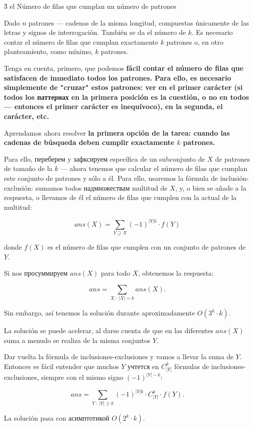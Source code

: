 \h3{ el Número de filas que cumplan un número de patrones }

Dado $n$ patrones --- cadenas de la misma longitud, compuestas únicamente de las letras y signos de interrogación. También se da el número de $k$. Es necesario contar el número de filas que cumplan exactamente $k$ patrones o, en otro planteamiento, como mínimo, $k$ patrones.

Tenga en cuenta, primero, que podemos \bf{fácil contar el número de filas} que satisfacen de inmediato todos los patrones. Para ello, es necesario simplemente de "cruzar" estos patrones: ver en el primer carácter (si todos los паттернах en la primera posición es la cuestión, o no en todos --- entonces el primer carácter es inequívoco), en la segunda, el carácter, etc.

Aprendamos ahora resolver \bf{la primera opción de la tarea}: cuando las cadenas de búsqueda deben cumplir exactamente $k$ patrones.

Para ello, переберем y зафксируем específica de un subconjunto de $X$ de patrones de tamaño de la $k$ --- ahora tenemos que calcular el número de filas que cumplan este conjunto de patrones y sólo a él. Para ello, usaremos la fórmula de inclusión-exclusión: sumamos todos надмножествам multitud de $X$, y, o bien se añade a la respuesta, o llevamos de él el número de filas que cumplen con la actual de la multitud:

$$ ans(X) = \sum_{Y \supseteq X} (-1)^{|Y|k} \cdot f(Y) $$

donde $f(X)$ es el número de filas que cumplen con un conjunto de patrones de $Y$.

Si nos просуммируем $ans(X)$ para todo $X$, obtenemos la respuesta:

$$ ans = \sum_{X ~ : ~ |X| = k} ans(X). $$

Sin embargo, así tenemos la solución durante aproximadamente $O(3^k \cdot k)$.

La solución se puede acelerar, al darse cuenta de que en las diferentes $ans(X)$ suma a menudo se realiza de la misma conjuntos $Y$.

Dar vuelta la fórmula de inclusiones-exclusiones y vamos a llevar la suma de $Y$. Entonces es fácil entender que muchos $Y$ учтется en $C_{|Y|}^k$ fórmulas de inclusiones-exclusiones, siempre con el mismo signo $(-1)^{|Y|-k}$:

$$ ans = \sum_{Y ~ : ~ |Y| \ge k} (-1)^{|Y|k} \cdot C_{|Y|}^k \cdot f(Y). $$

La solución pasa con асимптотикой $O(2^k \cdot k)$.

